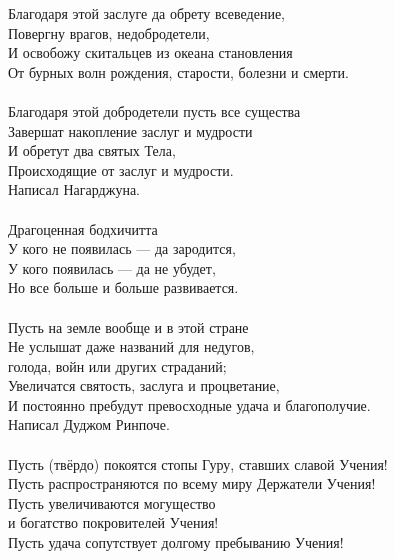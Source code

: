 


Благодаря этой заслуге да обрету всеведение,\\
Повергну врагов, недобродетели,\\
И освобожу скитальцев из океана становления \\
От бурных волн рождения, старости, болезни и смерти.\\
\\
Благодаря этой добродетели пусть все существа\\
Завершат накопление заслуг и мудрости \\
И обретут два святых Тела,\\
Происходящие от заслуг и мудрости.\\
\scriptsize
Написал Нагарджуна.\\
\normalsize
\\
Драгоценная бодхичитта\\
У кого не появилась — да зародится,\\
У кого появилась — да не убудет,\\
Но все больше и больше развивается.\\
\\
Пусть на земле вообще и в этой стране\\
Не услышат даже названий для недугов, \\ \indent голода, войн или других страданий;\\
Увеличатся святость, заслуга и процветание,\\
И постоянно пребудут превосходные удача и благополучие.\\
\scriptsize
Написал Дуджом Ринпоче.\\
\normalsize
\\
Пусть (твёрдо) покоятся стопы Гуру, ставших славой Учения!\\
Пусть распространяются по всему миру Держатели Учения!\\
Пусть увеличиваются могущество \\ \indent и богатство покровителей Учения!\\
Пусть удача сопутствует долгому пребыванию Учения!\\
\\
